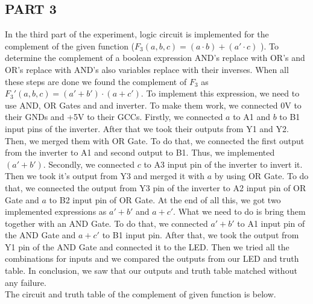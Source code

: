 \documentclass[pdftex,12pt,a4paper]{article}
\begin{document}
\subsection{PART 3}
In the third part of the experiment, logic circuit is implemented for the complement of the given function ($F_3(a,b,c) = (a \cdot b) + (a' \cdot c)$ ). To determine the complement of a boolean expression AND's replace with OR's and OR's replace with AND's also variables replace with their inverses. When all these steps are done we found the complement of $F_3$ as $F_3'(a,b,c) = (a' + b') \cdot (a + c')$. To implement this expression, we need to use AND, OR Gates and and inverter. To make them work, we connected 0V to their GNDs and +5V to their GCCs. Firstly, we connected $a$ to A1 and $b$ to B1 input pins of the inverter. After that we took their outputs from Y1 and Y2. Then, we merged them with OR Gate. To do that, we connected the first output from the inverter to A1 and second output to B1. Thus, we implemented $(a' + b')$. Secondly, we connected $c$ to A3 input pin of the inverter to invert it. Then we took it's output from Y3 and merged it with $a$ by using OR Gate. To do that, we connected the output from Y3 pin of the inverter to A2 input pin of OR Gate and $a$ to B2 input pin of OR Gate. At the end of all this, we got two implemented expressions as $a'+b'$ and $a+c'$. What we need to do is bring them together with an AND Gate. To do that, we connected $a'+b'$ to A1 input pin of the AND Gate and $a+c'$ to B1 input pin. After that, we took the output from Y1 pin of the AND Gate and connected it to the LED. Then we tried all the combinations for inputs and we compared the outputs from our LED and truth table. In conclusion, we saw that our outputs and truth table matched without any failure. \\

The circuit and truth table of the complement of given function is below.
\end{document}
